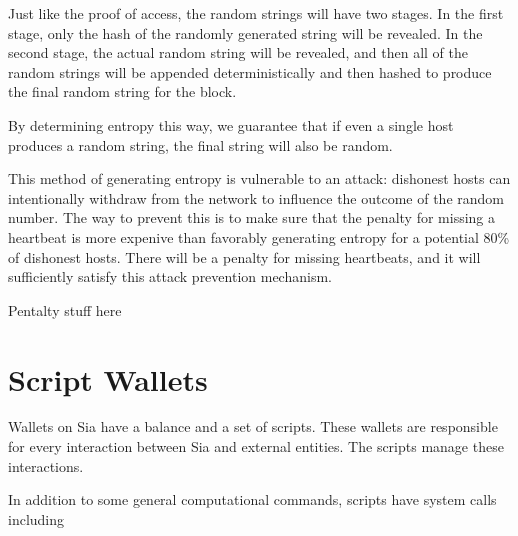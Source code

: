 \documentclass[twocolumn]{article}
\begin{document}
Just like the proof of access, the random strings will have two stages.
In the first stage, only the hash of the randomly generated string will be revealed.
In the second stage, the actual random string will be revealed, and then all of the random strings will be appended deterministically and then hashed to produce the final random string for the block.

By determining entropy this way, we guarantee that if even a single host produces a random string, the final string will also be random.

This method of generating entropy is vulnerable to an attack: dishonest hosts can intentionally withdraw from the network to influence the outcome of the random number.
The way to prevent this is to make sure that the penalty for missing a heartbeat is more expenive than favorably generating entropy for a potential 80\% of dishonest hosts.
There will be a penalty for missing heartbeats, and it will sufficiently satisfy this attack prevention mechanism.

\begin{center}
Pentalty stuff here
\end{center}

\section{Script Wallets}

Wallets on Sia have a balance and a set of scripts.
These wallets are responsible for every interaction between Sia and external entities.
The scripts manage these interactions.

In addition to some general computational commands, scripts have system calls including
\end{document}
